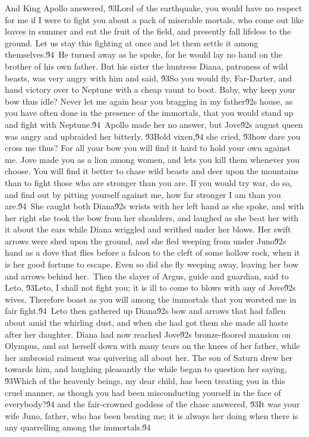 {And King Apollo answered, \'93Lord of the earthquake, you would have no respect for me if I were to fight you about a pack of miserable mortals, who come out like leaves in summer and eat the fruit of the field, and presently fall lifeless to the ground. Let us stay this fighting at once and let them settle it among themselves.\'94\
He turned away as he spoke, for he would lay no hand on the brother of his own father. But his sister the huntress Diana, patroness of wild beasts, was very angry with him and said, \'93So you would fly, Far-Darter, and hand victory over to Neptune with a cheap vaunt to boot. Baby, why keep your bow thus idle? Never let me again hear you bragging in my father\'92s house, as you have often done in the presence of the immortals, that you would stand up and fight with Neptune.\'94\
Apollo made her no answer, but Jove\'92s august queen was angry and upbraided her bitterly. \'93Bold vixen,\'94 she cried, \'93how dare you cross me thus? For all your bow you will find it hard to hold your own against me. Jove made you as a lion among women, and lets you kill them whenever you choose. You will find it better to chase wild beasts and deer upon the mountains than to fight those who are stronger than you are. If you would try war, do so, and find out by pitting yourself against me, how far stronger I am than you are.\'94\
She caught both Diana\'92s wrists with her left hand as she spoke, and with her right she took the bow from her shoulders, and laughed as she beat her with it about the ears while Diana wriggled and writhed under her blows. Her swift arrows were shed upon the ground, and she fled weeping from under Juno\'92s hand as a dove that flies before a falcon to the cleft of some hollow rock, when it is her good fortune to escape. Even so did she fly weeping away, leaving her bow and arrows behind her.\
Then the slayer of Argus, guide and guardian, said to Leto, \'93Leto, I shall not fight you; it is ill to come to blows with any of Jove\'92s wives. Therefore boast as you will among the immortals that you worsted me in fair fight.\'94\
Leto then gathered up Diana\'92s bow and arrows that had fallen about amid the whirling dust, and when she had got them she made all haste after her daughter. Diana had now reached Jove\'92s bronze-floored mansion on Olympus, and sat herself down with many tears on the knees of her father, while her ambrosial raiment was quivering all about her. The son of Saturn drew her towards him, and laughing pleasantly the while began to question her saying, \'93Which of the heavenly beings, my dear child, has been treating you in this cruel manner, as though you had been misconducting yourself in the face of everybody?\'94 and the fair-crowned goddess of the chase answered, \'93It was your wife Juno, father, who has been beating me; it is always her doing when there is any quarrelling among the immortals.\'94\
}
